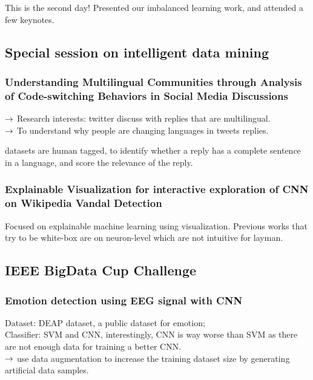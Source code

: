 This is the second day! Presented our imbalanced learning work, and attended a few keynotes.

\subsection{Special session on intelligent data mining}

\subsubsection{Understanding Multilingual Communities through Analysis of Code-switching Behaviors in Social Media Discussions}

$\rightarrow$ Research interests: twitter discuss with replies that are  multilingual. \\

$\rightarrow$ To understand why people are changing languages in tweets replies.

datasets are human tagged, to identify whether a reply has a complete sentence in a language, and score the relevance of the reply.

\subsubsection{Explainable Visualization for interactive exploration of CNN on Wikipedia Vandal Detection}

Focused on explainable machine learning using visualization. Previous works that try to be white-box are on neuron-level which are not intuitive for layman.

\spacerule

\subsection{IEEE BigData Cup Challenge}

\subsubsection{Emotion detection using EEG signal with CNN}

Dataset: DEAP dataset, a public  dataset for emotion;\\

Classifier: SVM and CNN, interestingly, CNN is way worse  than SVM as there  are not  enough data for training a better CNN.\\

$\rightarrow$ use  data augmentation to  increase  the  training dataset size by generating artificial data samples.\\

